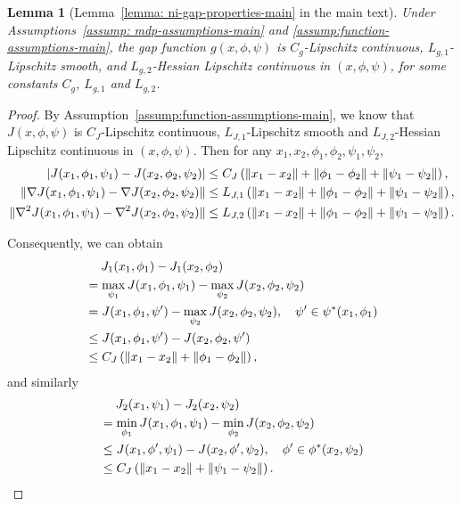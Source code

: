 \documentclass{article}
\theoremstyle{plain}
\newtheorem{lemma}{Lemma}
\theoremstyle{definition}
\theoremstyle{remark}
\begin{document}
\begin{lemma}[Lemma~\ref{lemma: ni-gap-properties-main} in the main text]
    \label{lemma: lipschitz-of-ni-gap}
    Under Assumptions~\ref{assump: mdp-assumptions-main} and \ref{assump:function-assumptions-main}, the gap function $g(x,\phi,\psi)$ is $C_g$-Lipschitz continuous, $L_{g,1}$-Lipschitz smooth, and $L_{g,2}$-Hessian Lipschitz continuous in $(x,\phi,\psi)$, for some constants $C_g$, $L_{g,1}$ and $L_{g,2}$. 
\end{lemma}
\begin{proof}
    By Assumption~\ref{assump:function-assumptions-main}, we know that $J(x,\phi,\psi)$ is $C_J$-Lipschitz continuous, $L_{J,1}$-Lipschitz smooth and $L_{J,2}$-Hessian Lipschitz continuous in $(x,\phi,\psi)$. 
    Then for any $x_1,x_2,\phi_1,\phi_2,\psi_1,\psi_2$,
    \begin{align}
        | J(x_1,\phi_1,\psi_1) - J(x_2,\phi_2,\psi_2) | &\leq C_J \left( \| x_1 - x_2 \| + \| \phi_1 - \phi_2 \| + \| \psi_1 - \psi_2 \| \right), \notag\\
        \|\nabla J(x_1,\phi_1,\psi_1) - \nabla J(x_2,\phi_2,\psi_2)\| &\leq L_{J,1} \left( \| x_1 - x_2 \| + \| \phi_1 - \phi_2 \| + \| \psi_1 - \psi_2 \| \right), \notag \\
        \|\nabla^2 J(x_1,\phi_1,\psi_1) - \nabla^2 J(x_2,\phi_2,\psi_2)\| &\leq L_{J,2} \left( \| x_1 - x_2 \| + \| \phi_1 - \phi_2 \| + \| \psi_1 - \psi_2 \| \right).
    \end{align}

    Consequently, we can obtain
    \begin{align}
        & \quad \; J_1(x_1,\phi_1) - J_1(x_2,\phi_2) \notag \\
        & =  \max_{\psi_1} J(x_1,\phi_1, \psi_1) - \max_{\psi_2} J(x_2,\phi_2, \psi_2)\notag\\
        & = J(x_1,\phi_1, \psi^\prime) - \max_{\psi_2} J(x_2,\phi_2, \psi_2) , \quad \psi^\prime \in \psi^*(x_1,\phi_1)\notag\\
        & \leq J(x_1,\phi_1, \psi^\prime) - J(x_2,\phi_2, \psi^\prime) \notag\\
         & \leq C_J \left( \| x_1 - x_2 \|+ \|\phi_1 - \phi_2\| \right) ,
    \end{align}
    and similarly
    \begin{align}
        & \quad \; J_2(x_1,\psi_1) - J_2(x_2,\psi_2) \notag \\
        & =  \min_{\phi_1} J(x_1,\phi_1, \psi_1) - \min_{\phi_2} J(x_2,\phi_2, \psi_2)\notag\\
        & \leq J(x_1,\phi^\prime, \psi_1) - J(x_2,\phi^\prime, \psi_2), \quad \phi^\prime \in \phi^*(x_2,\psi_2)\notag\\
         & \leq C_J \left( \| x_1 - x_2 \|+ \|\psi_1 - \psi_2\| \right) .
    \end{align}


\end{proof}
\end{document}
